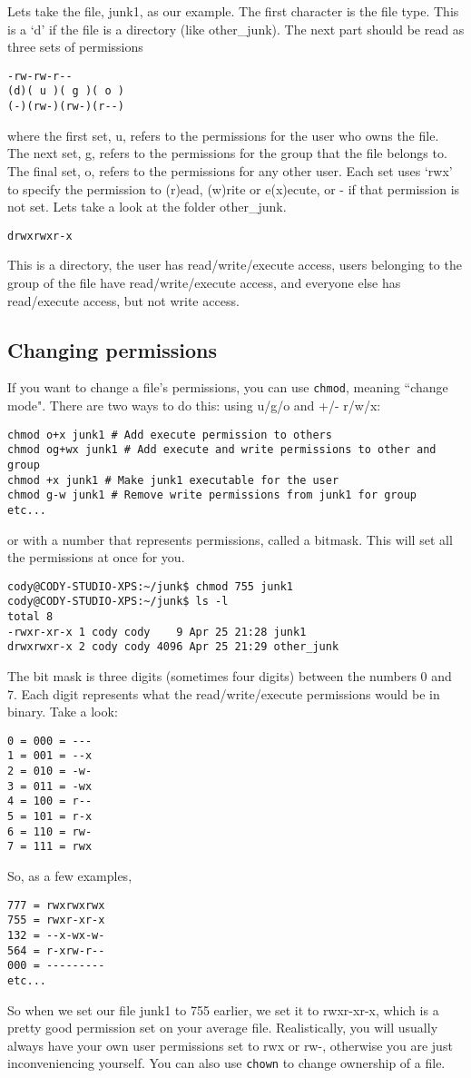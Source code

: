 \documentclass{article}
\begin{document}
Lets take the file, junk1, as our example.
The first character is the file type. This is a `d' if the file is a directory (like other\_junk).
The next part should be read as three sets of permissions
\begin{verbatim}
-rw-rw-r--
(d)( u )( g )( o ) 
(-)(rw-)(rw-)(r--)
\end{verbatim} 
where the first set, u, refers to the permissions for the user who owns the file.
The next set, g, refers to the permissions for the group that the file belongs to.
The final set, o, refers to the permissions for any other user. 
Each set uses `rwx' to specify the permission to (r)ead, (w)rite or e(x)ecute, or - if that permission is not set.
Lets take a look at the folder other\_junk.
\begin{verbatim}
drwxrwxr-x
\end{verbatim}
This is a directory, the user has read/write/execute access, users belonging to the group of the file have read/write/execute access, and everyone else has read/execute access, but not write access.

\subsection{Changing permissions}
If you want to change a file's permissions, you can use \texttt{chmod}, meaning ``change mode". There are two ways to do this: using u/g/o and +/- r/w/x:
\begin{verbatim}
chmod o+x junk1 # Add execute permission to others
chmod og+wx junk1 # Add execute and write permissions to other and group
chmod +x junk1 # Make junk1 executable for the user
chmod g-w junk1 # Remove write permissions from junk1 for group
etc...
\end{verbatim}
or with a number that represents permissions, called a bitmask. This will set all the permissions at once for you.
\begin{verbatim}
cody@CODY-STUDIO-XPS:~/junk$ chmod 755 junk1
cody@CODY-STUDIO-XPS:~/junk$ ls -l
total 8
-rwxr-xr-x 1 cody cody    9 Apr 25 21:28 junk1
drwxrwxr-x 2 cody cody 4096 Apr 25 21:29 other_junk
\end{verbatim}
The bit mask is three digits (sometimes four digits) between the numbers 0 and 7. Each digit represents what the read/write/execute permissions would be in binary. Take a look:
\begin{verbatim}
0 = 000 = --- 
1 = 001 = --x
2 = 010 = -w-
3 = 011 = -wx
4 = 100 = r--
5 = 101 = r-x
6 = 110 = rw-
7 = 111 = rwx
\end{verbatim}
So, as a few examples,
\begin{verbatim}
777 = rwxrwxrwx
755 = rwxr-xr-x
132 = --x-wx-w-
564 = r-xrw-r--
000 = ---------
etc...
\end{verbatim}
So when we set our file junk1 to 755 earlier, we set it to rwxr-xr-x, which is a pretty good permission set on your average file. Realistically, you will usually always have your own user permissions set to rwx or rw-, otherwise you are just inconveniencing yourself. You can also use \texttt{chown} to change ownership of a file.
\end{document}
